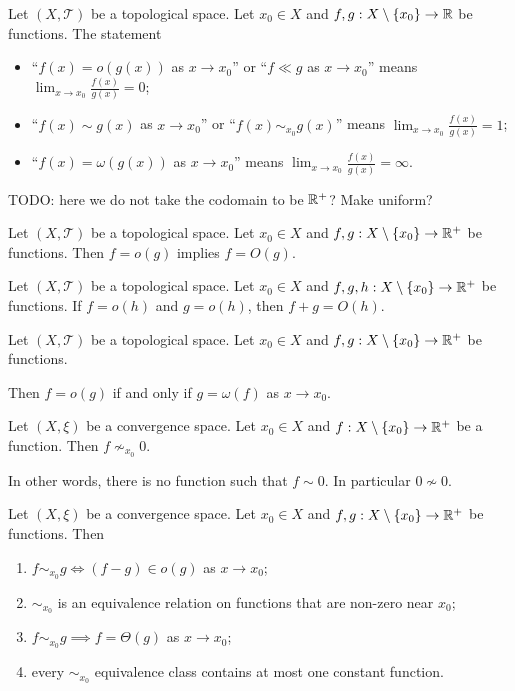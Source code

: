 \begin{definition}
Let $(X,\mathcal{T})$ be a topological space. Let $x_0 \in X$ and $f,g: X\setminus\{x_0\}\to \mathbb{R}$ be functions. The statement
\begin{itemize}
\item ``$f(x) = o(g(x))$ as $x\to x_0$'' or ``$f \ll g$ as $x\to x_0$'' means $\lim_{x\to x_0} \frac{f(x)}{g(x)} = 0$;
\item ``$f(x) \sim g(x)$ as $x\to x_0$'' or ``$f(x) \sim_{x_0} g(x)$'' means $\lim_{x\to x_0} \frac{f(x)}{g(x)} = 1$;
\item ``$f(x) = \omega(g(x))$ as $x\to x_0$'' means $\lim_{x\to x_0} \frac{f(x)}{g(x)} = \infty$.
\end{itemize}
\end{definition}
TODO: here we do not take the codomain to be $\mathbb{R}^+$? Make uniform?

\begin{lemma}
Let $(X,\mathcal{T})$ be a topological space. Let $x_0 \in X$ and $f,g: X\setminus\{x_0\}\to \mathbb{R}^+$ be functions. Then $f = o(g)$ implies $f = O(g)$.
\end{lemma}

\begin{lemma}
Let $(X,\mathcal{T})$ be a topological space. Let $x_0 \in X$ and $f,g, h: X\setminus\{x_0\}\to \mathbb{R}^+$ be functions. If $f = o(h)$ and $g = o(h)$, then $f+g = O(h)$.
\end{lemma}

\begin{lemma}
Let $(X,\mathcal{T})$ be a topological space. Let $x_0 \in X$ and $f,g: X\setminus\{x_0\}\to \mathbb{R}^+$ be functions.

Then $f = o(g)$ \textup{if and only if} $g = \omega(f)$ as $x\to x_0$.
\end{lemma}

\begin{lemma}
Let $(X,\xi)$ be a convergence space. Let $x_0 \in X$ and $f: X\setminus\{x_0\}\to \mathbb{R}^+$ be a function. Then $f \nsim_{x_0} 0$.
\end{lemma}
In other words, there is no function such that $f\sim 0$. In particular $0\nsim 0$.

\begin{lemma} \label{asymptoticEquivalenceLemma}
Let $(X,\xi)$ be a convergence space. Let $x_0 \in X$ and $f,g: X\setminus\{x_0\}\to \mathbb{R}^+$ be functions. Then
\begin{enumerate}
\item $f\sim_{x_0} g \iff (f-g)\in o(g)$ as $x\to x_0$;
\item $\sim_{x_0}$ is an equivalence relation on functions that are non-zero near $x_0$;
\item $f \sim_{x_0} g \implies f = \Theta(g)$ as $x\to x_0$;
\item every $\sim_{x_0}$ equivalence class contains at most one constant function.
\end{enumerate}
\end{lemma}

